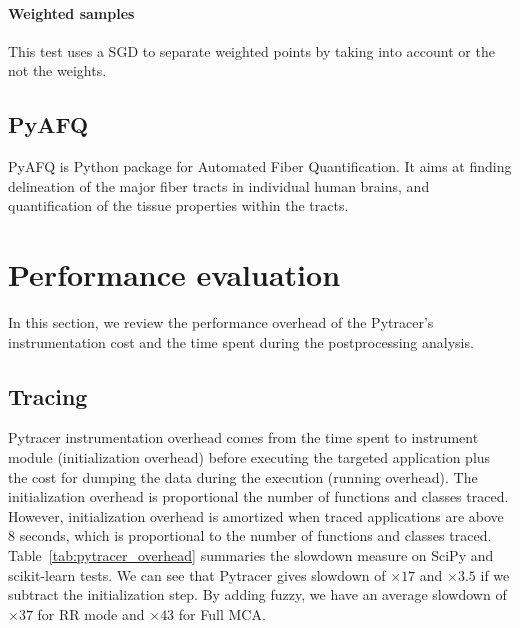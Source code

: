 \documentclass[11pt]{article}
\begin{document}


\paragraph{Weighted samples}

This test uses a SGD to separate weighted points by 
taking into account or the not the weights.



\subsection{PyAFQ}


PyAFQ is Python package for Automated Fiber Quantification.
It aims at finding delineation of the major fiber tracts in individual human brains, and quantification of the tissue properties within the tracts.

\section{Performance evaluation}

In this section, we review the performance overhead of the Pytracer's instrumentation cost
and the time spent during the postprocessing analysis. 

\subsection{Tracing}

Pytracer instrumentation overhead comes from the time spent to instrument module (initialization overhead)
before executing the targeted application plus the cost for dumping the data during the execution (running overhead).
The initialization overhead is proportional the number of functions and classes traced. 
However, initialization overhead is amortized when traced applications are above 8 seconds, which is proportional to 
the number of functions and classes traced.
Table~\ref{tab:pytracer_overhead} summaries the slowdown measure on SciPy
and scikit-learn tests.
We can see that Pytracer gives slowdown of $\times 17$ and
$\times 3.5$ if we subtract the initialization step.
By adding fuzzy, we have an average slowdown of $\times 37$ for RR mode and $\times 43$ for Full MCA.
\end{document}
